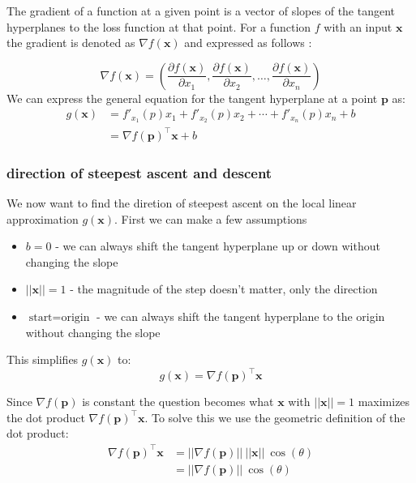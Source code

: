 \documentclass[12pt]{article}
\begin{document}
\begin{definition}[gradient]
    The gradient of a function at a given point is a vector of slopes of the tangent hyperplanes to the loss function at that point. For a function $f$ with an input $\mathbf{x}$ the gradient is denoted as $\nabla f(\mathbf{x})$ and expressed as follows : 
\end{definition}
\begin{equation}
    \nabla f(\mathbf{x}) = \left(\frac{\partial f(\mathbf{x})}{\partial x_1}, \frac{\partial f(\mathbf{x})}{\partial x_2}, \ldots, \frac{\partial f(\mathbf{x})}{\partial x_n}\right)  
\end{equation}
We can express the general equation for the tangent hyperplane at a point $\mathbf{p}$ as: 
\begin{align*}
    g(\mathbf{x}) & = f'_{x_1}(p)x_1 + f'_{x_2}(p)x_2 + \cdots + f'_{x_n}(p)x_n + b \\
    & = \nabla f(\mathbf{p})^\intercal \mathbf{x} + b
\end{align*}
\subsubsection*{direction of steepest ascent and descent}
We now want to find the diretion of steepest ascent on the local linear approximation $g(\mathbf{x})$. First we can make a few assumptions 
\begin{itemize}[leftmargin=*, noitemsep]
    \item $b = 0$ - we can always shift the tangent hyperplane up or down without changing the slope
    \item $||\mathbf{x}|| = 1$ - the magnitude of the step doesn't matter, only the direction
    \item $\text{start} = \text{origin}$  - we can always shift the tangent hyperplane to the origin without changing the slope
\end{itemize}

This simplifies $g(\mathbf{x})$ to:
\begin{equation}
    g(\mathbf{x}) = \nabla f(\mathbf{p})^\intercal \mathbf{x}
\end{equation}

Since $\nabla f(\mathbf{p})$ is constant the question becomes what $\mathbf{x}$ with $||\mathbf{x}|| = 1$ maximizes the dot product $\nabla f(\mathbf{p})^\intercal \mathbf{x}$. To solve this we use the geometric definition of the dot product:
\begin{align*}
    \nabla f(\mathbf{p})^\intercal \mathbf{x} & = ||\nabla f(\mathbf{p})||\ ||\mathbf{x}|| \ \cos(\theta) \\
    & = ||\nabla f(\mathbf{p})|| \ \cos(\theta)
\end{align*}
\end{document}

